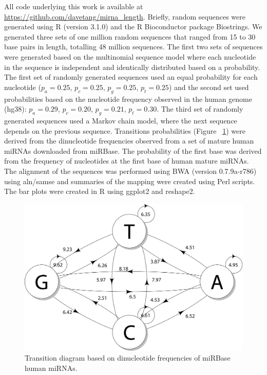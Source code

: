 \documentclass{article}
\begin{document}
All code underlying this work is available at \url{https://github.com/davetang/mirna_length}. Briefly, random sequences were generated using R (version 3.1.0) and the R Bioconductor package Biostrings\cite{biostrings_package}. We generated three sets of one million random sequences that ranged from 15 to 30 base pairs in length, totalling 48 million sequences. The first two sets of sequences were generated based on the multinomial sequence model where each nucleotide in the sequence is independent and identically distributed based on a probability. The first set of randomly generated sequences used an equal probability for each nucleotide ($p_{a} = 0.25$, $p_{c} = 0.25$, $p_{g} = 0.25$, $p_{t} = 0.25$) and the second set used probabilities based on the nucleotide frequency observed in the human genome (hg38): $p_{a} = 0.29$, $p_{c} = 0.20$, $p_{g} = 0.21$, $p_{t} = 0.30$. The third set of randomly generated sequences used a Markov chain model, where the next sequence depends on the previous sequence. Transitions probabilities (Figure ~\ref{fig:transition}) were derived from the dinucleotide frequencies observed from a set of mature human miRNAs downloaded from miRBase\cite{pmid21037258}. The probability of the first base was derived from the frequency of nucleotides at the first base of human mature miRNAs. The alignment of the sequences was performed using BWA\cite{pmid19451168} (version 0.7.9a-r786) using aln/samse and summaries of the mapping were created using Perl scripts. The bar plots were created in R using ggplot2\cite{ggplot2_book} and reshape2\cite{reshape_wickham}.

\begin{figure}[h]
   \centering
   \includegraphics[width=.8\textwidth,natwidth=3297,natheight=2227]{image/transition.png}
   \caption{Transition diagram based on dinucleotide frequencies of miRBase human miRNAs.}
   \label{fig:transition}
\end{figure}
\end{document}
